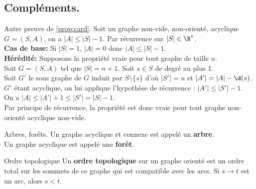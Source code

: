 \documentclass[french, 11pt]{article}
\begin{document}
\subsection{Compléments.}

\begin{prop}{Autre preuve de \ref{prop:card}.}{}
    Soit un graphe non-vide, non-orienté, acyclique $G=(S,A)$, on a $|A|\leq|S|-1$.
    \tcblower
    Par récurrence sur $|S|\in\N^*$.\\
    \textbf{Cas de base:} Si $|S|=1$, $|A|=0$ donc $|A|\leq|S|-1$.\\
    \textbf{Hérédité:} Supposons la propriété vraie pour tout graphe de taille $n$.\\
    Soit $G=(S,A)$ tel que $|S|=n+1$. Soit $s\in S$ de degré au plus 1.\\
    Soit $G'$ le sous graphe de $G$ induit par $S\setminus\{s\}$ d'où $|S'| = n$ et $|A'|=|A|-\d(s)$.\\
    $G'$ étant acyclique, on lui applique l'hypothèse de récurrence : $|A'|\leq|S'|-1$.\\
    On a $|A|\leq|A'|+1\leq|S'|=|S|-1$.\\
    Par principe de récurrence, la propriété est donc vraie pour tout graphe non-orienté acyclique non-vide.
\end{prop}

\begin{defi}{Arbres, forêts.}{}
    Un graphe acyclique et connexe est appelé un \textbf{arbre}.\\
    Un graphe acyclique est appelé une \textbf{forêt}. 
\end{defi}

\begin{defi}{Ordre topologique}{}
    Un \textbf{ordre topologique} sur un graphe orienté est un ordre total sur les sommets de ce graphe qui est compatible avec les arcs. Si $s\to t$ est un arc, alors $s<t$.
\end{defi}
\end{document}
